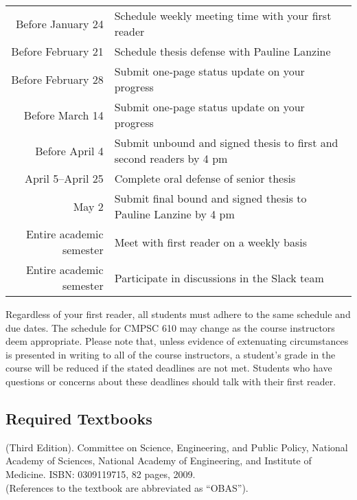 \begin{center}
\begin{tabular}{r|l}
\hline

Before January 24   & Schedule weekly meeting time with your first reader \\
Before February 21  & Schedule thesis defense with Pauline Lanzine \\
Before February 28  & Submit one-page status update on your progress \\
Before March 14     & Submit one-page status update on your progress \\
Before April 4      & Submit unbound and signed thesis to first and second readers by 4 pm \\
April 5--April 25   & Complete oral defense of senior thesis \\
May 2               & Submit final bound and signed thesis to Pauline Lanzine by 4 pm\\

\hline
Entire academic semester & Meet with first reader on a weekly basis \\
Entire academic semester & Participate in discussions in the Slack team \\
\hline
\end{tabular}
\end{center}

\noindent Regardless of your first reader, all students must adhere to the same schedule and due dates. The schedule for
CMPSC 610 may change as the course instructors deem appropriate. Please note that, unless evidence of extenuating
circumstances is presented in writing to all of the course instructors, a student's grade in the course will be reduced
if the stated deadlines are not met. Students who have questions or concerns about these deadlines should talk with
their first reader.

\vspace{-.15in}
\subsection*{Required Textbooks}
\vspace{-.05in}

 (Third Edition).  Committee on Science,
Engineering, and Public Policy, National Academy of Sciences, National Academy of Engineering, and Institute of
Medicine. ISBN: 0309119715, 82 pages, 2009.\\ (References to the textbook are abbreviated as ``OBAS'').


